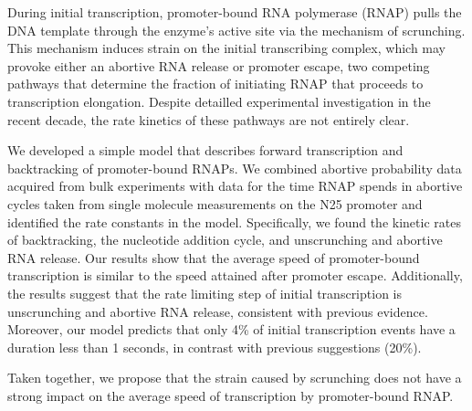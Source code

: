 During initial transcription, promoter-bound RNA polymerase (RNAP) pulls the
DNA template through the enzyme's active site via the mechanism of scrunching.
This mechanism induces strain on the initial transcribing complex, which may
provoke either an abortive RNA release or promoter escape, two competing
pathways that determine the fraction of initiating RNAP that proceeds to
transcription elongation. Despite detailled experimental investigation in the
recent decade, the rate kinetics of these pathways are not entirely clear.

We developed a simple model that describes forward transcription and
backtracking of promoter-bound RNAPs. We combined abortive probability data
acquired from bulk experiments with data for the time RNAP spends in abortive
cycles taken from single molecule measurements on the N25 promoter and
identified the rate constants in the model. Specifically, we found the kinetic
rates of backtracking, the nucleotide addition cycle, and unscrunching and
abortive RNA release. Our results show that the average speed of
promoter-bound transcription is similar to the speed attained after promoter
escape. Additionally, the results suggest that the rate limiting step of
initial transcription is unscrunching and abortive RNA release, consistent
with previous evidence. Moreover, our model predicts that only 4\% of initial
transcription events have a duration less than 1 seconds, in contrast with
previous suggestions (20\%).  

Taken together, we propose that the strain caused by scrunching does not have
a strong impact on the average speed of transcription by promoter-bound RNAP.
